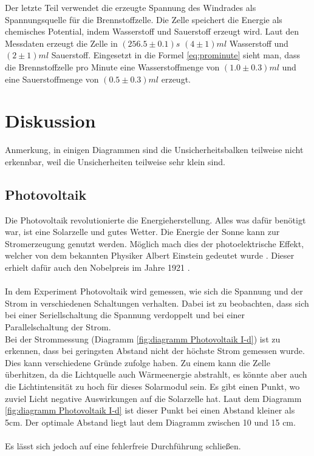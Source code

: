 \documentclass[12pt,a4paper,twoside]{article}
\begin{document}
\noindent
Der letzte Teil verwendet die erzeugte Spannung des Windrades als Spannungsquelle für die Brennstoffzelle. Die Zelle speichert die Energie als chemisches Potential, indem Wasserstoff und Sauerstoff erzeugt wird. 
Laut den Messdaten erzeugt die Zelle in $(256.5 \pm 0.1)s$ $(4 \pm 1)ml$ Wasserstoff und $(2 \pm 1)ml$ Sauerstoff. 
Eingesetzt in die Formel \ref{eq:prominute} sieht man, dass die Brennstoffzelle pro Minute eine Wasserstoffmenge von $(1.0 \pm 0.3)ml$ und eine Sauerstoffmenge von $(0.5 \pm 0.3)ml$ erzeugt. 

\section{Diskussion} %
Anmerkung, in einigen Diagrammen sind die Unsicherheitsbalken teilweise nicht erkennbar, weil die Unsicherheiten teilweise sehr klein sind. 

\subsection{Photovoltaik}
Die Photovoltaik revolutionierte die Energieherstellung. Alles was dafür benötigt war, ist eine Solarzelle und gutes Wetter. Die Energie der Sonne kann zur Stromerzeugung genutzt werden. 
Möglich mach dies der photoelektrische Effekt, welcher von dem bekannten Physiker Albert Einstein gedeutet wurde \cite{wiki1}. Dieser erhielt dafür auch den Nobelpreis im Jahre 1921 \cite{wiki2}. 
\\
\\
In dem Experiment Photovoltaik wird gemessen, wie sich die Spannung und der Strom in verschiedenen Schaltungen verhalten. 
Dabei ist zu beobachten, dass sich bei einer Seriellschaltung die Spannung verdoppelt und bei einer Parallelschaltung der Strom. 
\\
Bei der Strommessung (Diagramm \ref{fig:diagramm Photovoltaik I-d}) ist zu erkennen, dass bei geringsten Abstand nicht der höchste Strom gemessen wurde. 
Dies kann verschiedene Gründe zufolge haben. Zu einem kann die Zelle überhitzen, da die Lichtquelle auch Wärmeenergie abstrahlt, es könnte aber auch die Lichtintensität zu hoch für dieses Solarmodul sein. 
Es gibt einen Punkt, wo zuviel Licht negative Auswirkungen auf die Solarzelle hat. Laut dem Diagramm \ref{fig:diagramm Photovoltaik I-d} ist dieser Punkt bei einen Abstand kleiner als 5cm. Der optimale Abstand liegt laut dem Diagramm zwischen 10 und 15 cm. 
\\
\\
Es lässt sich jedoch auf eine fehlerfreie Durchführung schließen. 
\end{document}
